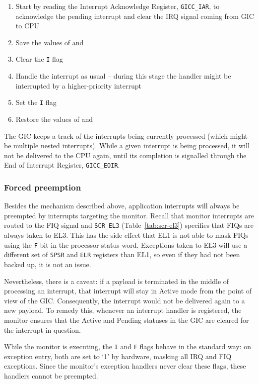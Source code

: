 \begin{enumerate}
    \item Start by reading the Interrupt Acknowledge Register, \texttt{GICC\_IAR}, to acknowledge the pending interrupt and clear the IRQ signal coming from GIC to CPU
    \item Save the values of \SPSRELn and \ELRELn
    \item Clear the \texttt{I} flag
    \item Handle the interrupt as usual -- during this stage the handler might be interrupted by a higher-priority interrupt
    \item Set the \texttt{I} flag
    \item Restore the values of \SPSRELn and \ELRELn
\end{enumerate}

The GIC keeps a track of the interrupts being currently processed (which might be multiple nested interrupts). While a given interrupt is being processed, it will not be delivered to the CPU again, until its completion is signalled through the End of Interrupt Register, \texttt{GICC\_EOIR}.

\subsubsection{Forced preemption}

Besides the mechanism described above, application interrupts will always be preempted by interrupts targeting the monitor. Recall that monitor interrupts are routed to the FIQ signal and \texttt{SCR\_EL3} (Table~\ref{tab:scr-el3}) specifies that FIQs are always taken to EL3. This has the side effect that EL1 is not able to mask FIQs using the \texttt{F} bit in the processor status word. Exceptions taken to EL3 will use a different set of \texttt{SPSR} and \texttt{ELR} registers than EL1, so even if they had not been backed up, it is not an issue.

Nevertheless, there is a caveat: if a payload is terminated in the middle of processing an interrupt, that interrupt will stay in Active mode from the point of view of the GIC. Consequently, the interrupt would not be delivered again to a new payload. To remedy this, whenever an interrupt handler is registered, the monitor ensures that the Active and Pending statuses in the GIC are cleared for the interrupt in question.

While the monitor is executing, the \texttt{I} and \texttt{F} flags behave in the standard way: on exception entry, both are set to `1' by hardware, masking all IRQ and FIQ exceptions. Since the monitor's exception handlers never clear these flags, these handlers cannot be preempted.

